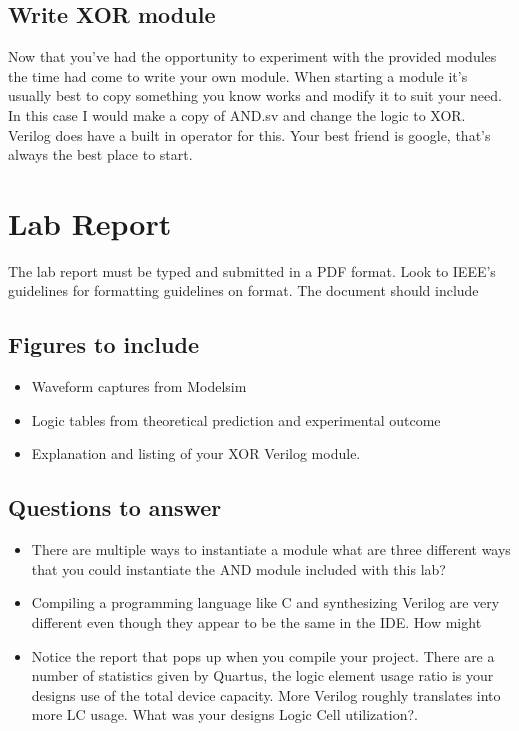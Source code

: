 \documentclass[12pt,journal]{IEEEtran}
\begin{document}
      \subsection{\bfseries Write XOR module} 
      Now that you've had the opportunity to experiment with the provided modules the time had come to write
      your own module. When starting a module it's usually best to copy something you know works and modify it
      to suit your need. In this case I would make a copy of AND.sv and change the logic to XOR. Verilog does
      have a built in operator for this. Your best friend is google, that's always the best place to start.

  \section{\bfseries  Lab Report}
    The lab report must be typed and submitted in a PDF format. Look to IEEE's guidelines for formatting guidelines
    on format. The document should include
    \subsection{\bfseries Figures to include}
    \begin{itemize}
      \item Waveform captures from Modelsim
      \item Logic tables from theoretical prediction and experimental outcome
      \item Explanation and listing of your XOR Verilog module.
    \end{itemize}

    \subsection{\bfseries Questions to answer}
    \begin{itemize}
      \item There are multiple ways to instantiate a module what are three different ways that you could
            instantiate the AND module included with this lab?
      \item Compiling a programming language like C and synthesizing Verilog are very different even though they
            appear to be the same in the IDE. How might 
      \item Notice the report that pops up when you compile your project. There are a number of statistics given
            by Quartus, the logic element usage ratio is your designs use of the total device capacity. More Verilog
            roughly translates into more LC usage. What was your designs Logic Cell utilization?. 
    \end{itemize}
\end{document}
